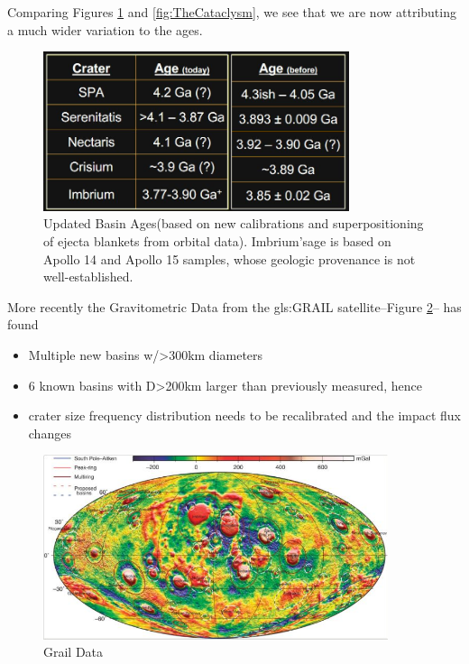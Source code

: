 \documentclass[]{article}
\begin{document}
Comparing Figures \ref{fig:UpdatedBasinAges} and \ref{fig:TheCataclysm}, we see that we are now attributing a much wider variation to the ages.
\begin{figure}[H]
	\begin{center}
		\caption[Updated Basin Ages]{Updated Basin Ages(based on new calibrations and superpositioning of ejecta blankets from orbital data). Imbrium’sage is based on Apollo 14 and Apollo 15 samples, whose geologic provenance is not well-established.}\label{fig:UpdatedBasinAges}
		\includegraphics[width=0.8\textwidth]{UpdatedBasinAges}
	\end{center}
\end{figure}

More recently the Gravitometric Data from the \gls{gls:GRAIL} satellite--Figure \ref{fig:GrailData}-- has found
\begin{itemize}
	\item Multiple new basins w/>300km diameters
	\item 6 known basins with D>200km larger than previously measured, hence
	\item crater size frequency distribution needs to be recalibrated and the impact flux changes
\end{itemize}

\begin{figure}[H]
	\caption{Grail Data}\label{fig:GrailData}
	\includegraphics[width=0.9\textwidth]{GrailData}
\end{figure}
\end{document}
